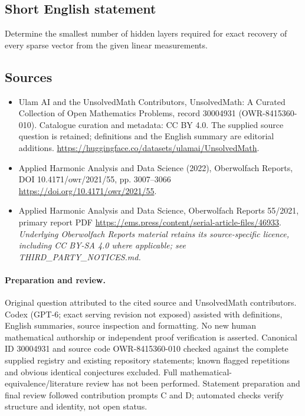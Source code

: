 \documentclass[11pt]{article}
\begin{document}
\subsection{Short English statement}
Determine the smallest number of hidden layers required for exact recovery of every sparse vector from the given linear measurements.
\subsection{Sources}
\begin{itemize}
\item[\hypertarget{source:30004931:1}{S1}] Ulam AI and the UnsolvedMath Contributors, UnsolvedMath: A Curated Collection of Open Mathematics Problems, record 30004931 (OWR-8415360-010). Catalogue curation and metadata: CC BY 4.0. The supplied source question is retained; definitions and the English summary are editorial additions.
\url{https://huggingface.co/datasets/ulamai/UnsolvedMath}.
\item[\hypertarget{source:30004931:2}{S2}] Applied Harmonic Analysis and Data Science (2022), Oberwolfach Reports, DOI 10.4171/owr/2021/55, pp. 3007--3066
\url{https://doi.org/10.4171/owr/2021/55}.
\item[\hypertarget{source:30004931:3}{S3}] Applied Harmonic Analysis and Data Science, Oberwolfach Reports 55/2021, primary report PDF
\url{https://ems.press/content/serial-article-files/46933}.
\textit{Underlying Oberwolfach Reports material retains its source-specific licence, including CC BY-SA 4.0 where applicable; see THIRD\_PARTY\_NOTICES.md.}
\end{itemize}
\paragraph{Preparation and review.}
Original question attributed to the cited source and UnsolvedMath contributors. Codex (GPT-6; exact serving revision not exposed) assisted with definitions, English summaries, source inspection and formatting. No new human mathematical authorship or independent proof verification is asserted. Canonical ID 30004931 and source code OWR-8415360-010 checked against the complete supplied registry and existing repository statements; known flagged repetitions and obvious identical conjectures excluded. Full mathematical-equivalence/literature review has not been performed. Statement preparation and final review followed contribution prompts C and D; automated checks verify structure and identity, not open status.
\label{end:30004931}
\end{document}
